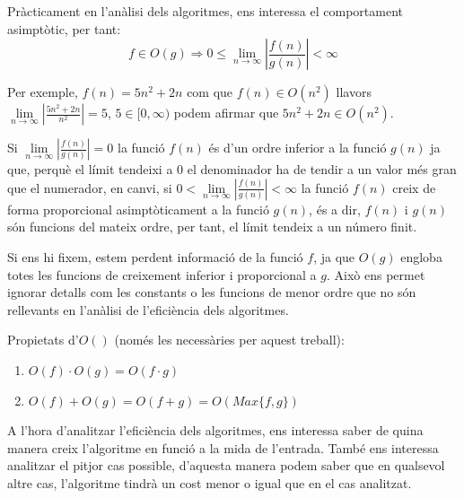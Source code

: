 Pràcticament en l'anàlisi dels algoritmes, ens interessa el comportament asimptòtic, per tant:
\[f \in O(g) \Rightarrow 0 \leq \lim\limits_{n \to \infty} |\frac{f(n)}{g(n)}| < \infty \]




Per exemple, $f(n) = 5n^2 + 2n$ com que $f(n) \in O(n^2)$ llavors $\lim\limits_{n \to \infty} |\frac{5n^2 + 2n}{n^2}| = 5 $, $5 \in [0, \infty)$ podem afirmar que $5n^2 + 2n \in O(n^2)$. 

Si $\lim\limits_{n \to \infty} |\frac{f(n)}{g(n)}| = 0$ la funció $f(n)$ és d'un ordre inferior a la funció $g(n)$ ja que, perquè el límit tendeixi a 0 el denominador ha de tendir a un valor més gran que el numerador, en canvi, si $0 < \lim\limits_{n \to \infty} |\frac{f(n)}{g(n)}| < \infty$ la funció $f(n)$ creix de forma proporcional asimptòticament a la funció $g(n)$, és a dir, $f(n)$ i $g(n)$ són funcions del mateix ordre, per tant, el límit tendeix a un número finit.

Si ens hi fixem, estem perdent informació de la funció $f$, ja que $O(g)$ engloba totes les funcions de creixement inferior i proporcional a $g$. Això ens permet ignorar detalls com les constants o les funcions de menor ordre que no són rellevants en l'anàlisi de l'eficiència dels algoritmes.

Propietats d'$O()$ (només les necessàries per aquest treball):
\begin{enumerate}
    \item $O(f) \cdot O(g) = O(f \cdot g)$
    \item $O(f) + O(g) = O(f + g) = O(Max\{f,g\})$
\end{enumerate}

A l'hora d'analitzar l'eficiència dels algoritmes, ens interessa saber de quina manera creix l'algoritme en funció a la mida de l'entrada. També ens interessa analitzar el pitjor cas possible, d'aquesta manera podem saber que en qualsevol altre cas, l'algoritme tindrà un cost menor o igual que en el cas analitzat.

